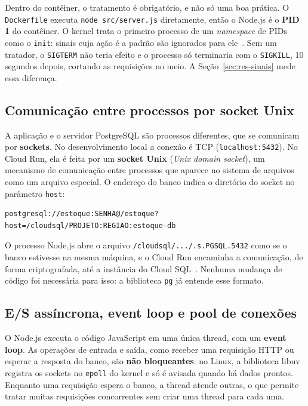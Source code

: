 \documentclass[12pt,a4paper]{article}
\newcommand{\arq}[1]{\texttt{#1}}
\begin{document}
Dentro do contêiner, o tratamento é obrigatório, e não só uma boa prática. O \arq{Dockerfile}
executa \texttt{node src/server.js} diretamente, então o Node.js é o \textbf{PID 1} do
contêiner. O kernel trata o primeiro processo de um \emph{namespace} de PIDs como o
\texttt{init}: sinais cuja ação é a padrão são ignorados para ele~\cite{pidns}. Sem um tratador, o
\texttt{SIGTERM} não teria efeito e o processo só terminaria com o \texttt{SIGKILL}, 10
segundos depois, cortando as requisições no meio. A Seção~\ref{sec:res-sinais} mede essa
diferença.

\subsection{Comunicação entre processos por socket Unix}

A aplicação e o servidor PostgreSQL são processos diferentes, que se comunicam por
\textbf{sockets}. No desenvolvimento local a conexão é TCP (\texttt{localhost:5432}). No Cloud
Run, ela é feita por um \textbf{socket Unix} (\emph{Unix domain socket}), um mecanismo de
comunicação entre processos que aparece no sistema de arquivos como um arquivo especial. O
endereço do banco indica o diretório do socket no parâmetro \texttt{host}:

\begin{lstlisting}[caption={Formato do \texttt{DATABASE\_URL} no Cloud Run.}]
postgresql://estoque:SENHA@/estoque?host=/cloudsql/PROJETO:REGIAO:estoque-db
\end{lstlisting}

O processo Node.js abre o arquivo \texttt{/cloudsql/.../.s.PGSQL.5432} como se o banco estivesse
na mesma máquina, e o Cloud Run encaminha a comunicação, de forma criptografada, até a
instância do Cloud SQL~\cite{cloudsql}. Nenhuma mudança de código foi necessária para isso: a biblioteca
\texttt{pg} já entende esse formato.

\subsection{E/S assíncrona, event loop e pool de conexões}

O Node.js executa o código JavaScript em uma única thread, com um \textbf{event loop}. As
operações de entrada e saída, como receber uma requisição HTTP ou esperar a resposta do banco,
são \textbf{não bloqueantes}: no Linux, a biblioteca libuv registra os sockets no
\texttt{epoll} do kernel e só é avisada quando há dados prontos. Enquanto uma requisição espera
o banco, a thread atende outras, o que permite tratar muitas requisições concorrentes sem criar
uma thread para cada uma.
\end{document}
